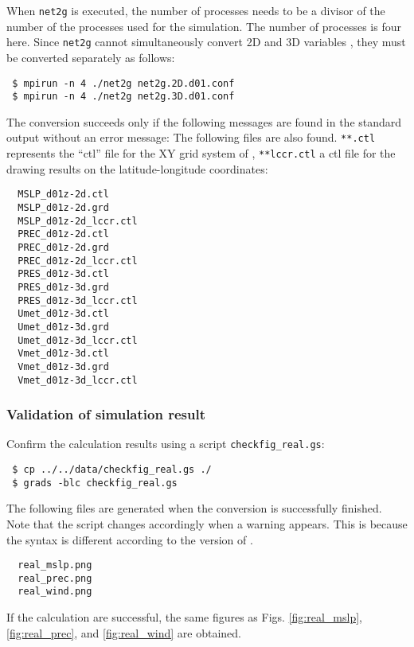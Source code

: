 When \verb|net2g| is executed, the number of processes needs to be a divisor of the number of the processes used for the simulation. 
The number of processes is four here. Since \verb|net2g| cannot simultaneously convert 2D and 3D variables , they must be converted separately as follows:
\begin{verbatim}
 $ mpirun -n 4 ./net2g net2g.2D.d01.conf
 $ mpirun -n 4 ./net2g net2g.3D.d01.conf
\end{verbatim}
The conversion succeeds only if the following messages are found  in the standard output without an error message:
The following files are also found. \verb|**.ctl| represents the ``ctl'' file for the XY grid system of \scalerm, \verb|**lccr.ctl| a ctl file for the drawing results on the latitude-longitude coordinates:
\begin{verbatim}
  MSLP_d01z-2d.ctl
  MSLP_d01z-2d.grd
  MSLP_d01z-2d_lccr.ctl
  PREC_d01z-2d.ctl
  PREC_d01z-2d.grd
  PREC_d01z-2d_lccr.ctl
  PRES_d01z-3d.ctl
  PRES_d01z-3d.grd
  PRES_d01z-3d_lccr.ctl
  Umet_d01z-3d.ctl
  Umet_d01z-3d.grd
  Umet_d01z-3d_lccr.ctl
  Vmet_d01z-3d.ctl
  Vmet_d01z-3d.grd
  Vmet_d01z-3d_lccr.ctl
\end{verbatim}


\subsubsection{Validation of simulation result}
Confirm the calculation results using a \grads script \verb|checkfig_real.gs|: 
\begin{verbatim}
 $ cp ../../data/checkfig_real.gs ./
 $ grads -blc checkfig_real.gs
\end{verbatim}
The following files are generated when the conversion is successfully finished. Note that the script changes accordingly when a warning appears. This is because the syntax is different according to the version of \grads.
\begin{verbatim}
  real_mslp.png
  real_prec.png
  real_wind.png
\end{verbatim}
If the calculation are successful, the same figures as Figs. \ref{fig:real_mslp}, \ref{fig:real_prec}, and \ref{fig:real_wind}  are obtained.

